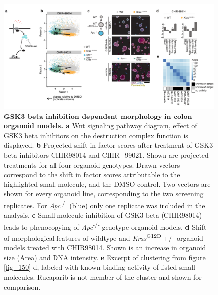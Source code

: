 \begin{flushleft}
\begin{figure}[h]
\centering
\includegraphics[scale=0.75,
                keepaspectratio]{figures/adenomaprofiling/pdf/fig_2_4_2.pdf}
\caption[GSK3 beta inhibition dependent morphology in colon organoid models]{\textbf{GSK3 beta inhibition dependent morphology in colon organoid models. a} Wnt signaling pathway diagram, effect of GSK3 beta inhibitors on the destruction complex function is displayed. \textbf{b} Projected shift in factor scores after treatment of GSK3 beta inhibitors CHIR98014 and CHIR−99021. Shown are projected treatments for all four organoid genotypes. Drawn vectors correspond to the shift in factor scores attributable to the highlighted small molecule, and the DMSO control. Two vectors are shown for every organoid line, corresponding to the two screening replicates. For \textit{Apc}\textsuperscript{-/-} (blue) only one replicate was included in the analysis. \textbf{c} Small molecule inhibition of GSK3 beta (CHIR98014) leads to phenocopying of \textit{Apc}\textsuperscript{-/-}  genotype organoid models. \textbf{d} Shift of morphological features of wildtype and \textit{Kras}\textsuperscript{G12D} +/- organoid models treated with CHIR98014. Shown is an increase in organoid size (Area) and DNA intensity. \textbf{e} Excerpt of clustering from figure \ref{fig_150} d, labeled with known binding activity of listed small molecules. Rucaparib is not member of the cluster and shown for comparison.}
\label{fig_185}
\end{figure}
\bigbreak


\end{flushleft}
